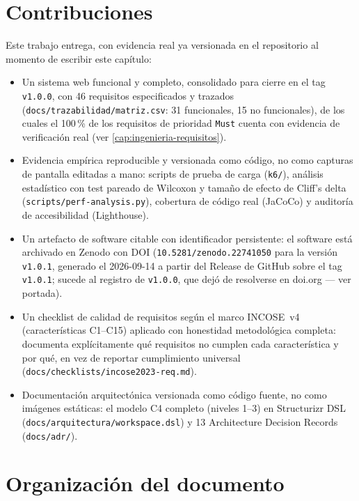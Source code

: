 \section{Contribuciones}

Este trabajo entrega, con evidencia real ya versionada en el
repositorio al momento de escribir este capítulo:

\begin{itemize}[leftmargin=1.2cm]
  \item Un sistema web funcional y completo, consolidado para cierre en el tag \texttt{v1.0.0}, con
    46 requisitos especificados y trazados
    (\texttt{docs/trazabilidad/matriz.csv}: 31 funcionales, 15 no
    funcionales), de los cuales el 100\,\% de los requisitos de
    prioridad \texttt{Must} cuenta con evidencia de verificación real
    (ver \autoref{cap:ingenieria-requisitos}).
  \item Evidencia empírica reproducible y versionada como código, no
    como capturas de pantalla editadas a mano: scripts de prueba de
    carga (\texttt{k6/}), análisis estadístico con test pareado de
    Wilcoxon y tamaño de efecto de Cliff's delta
    (\texttt{scripts/perf-analysis.py}), cobertura de código real
    (JaCoCo) y auditoría de accesibilidad (Lighthouse).
  \item Un artefacto de software citable con identificador persistente:
    el software está archivado en Zenodo con DOI
    (\texttt{10.5281/zenodo.22741050} para la versión \texttt{v1.0.1},
    generado el 2026-09-14 a partir del Release de GitHub sobre el tag
    \texttt{v1.0.1}; sucede al registro de \texttt{v1.0.0}, que dejó de
    resolverse en doi.org — ver portada).
  \item Un checklist de calidad de requisitos según el marco INCOSE~v4
    (características C1--C15) aplicado con honestidad metodológica
    completa: documenta explícitamente qué requisitos no cumplen cada
    característica y por qué, en vez de reportar cumplimiento universal
    (\texttt{docs/checklists/incose2023-req.md}).
  \item Documentación arquitectónica versionada como código fuente, no
    como imágenes estáticas: el modelo C4 completo (niveles 1--3) en
    Structurizr DSL (\texttt{docs/arquitectura/workspace.dsl}) y 13
    Architecture Decision Records (\texttt{docs/adr/}).
\end{itemize}

\section{Organización del documento}

